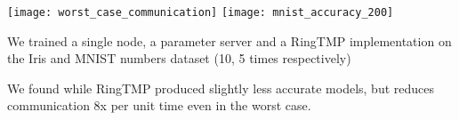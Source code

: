 \documentclass[a4paper]{article}
\begin{document}
{\begin{multicols}{2}
        \texttt{[image: worst\_case\_communication]}\newline
        \texttt{[image: mnist\_accuracy\_200]}
        \begin{compactitem}
            \item We trained a single node, a parameter server and a RingTMP
            implementation on the Iris and MNIST numbers dataset (10, 5 times
            respectively)
            \item We found while RingTMP produced slightly less accurate models,
            but reduces communication 8x per unit time even in the worst case.
        \end{compactitem}
    
    \end{multicols}
}


 
\end{document}
